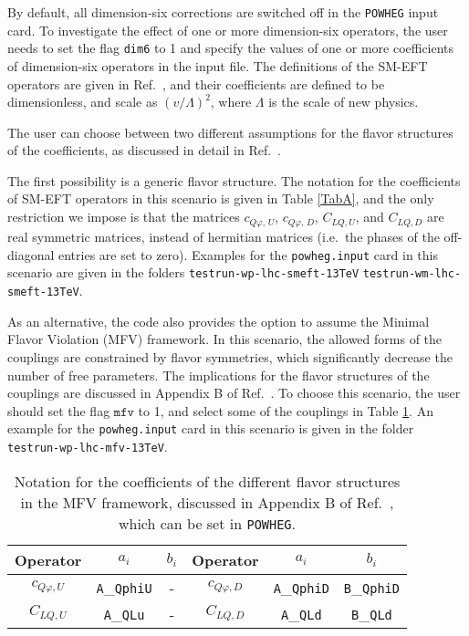 \documentclass[paper]{JHEP3}
\newcommand\POWHEG{{\tt POWHEG}}
\begin{document}
By default, all dimension-six corrections are switched off in the \POWHEG{} input card.
To investigate the effect of one or more dimension-six operators, the user  needs to set the flag \texttt{dim6} to 1 and specify the values of 
one or more coefficients of dimension-six operators in the input file. The definitions of the SM-EFT operators are given in Ref.\ \cite{Alioli:2018ljm},
and their coefficients are defined to be dimensionless, and scale as $(v/\Lambda)^2$, where $\Lambda$ is the scale of new physics.

The user can choose between two different assumptions for the flavor structures of the coefficients, as discussed in detail in Ref.\ \cite{Alioli:2018ljm}.

The first possibility is a generic flavor structure. The notation for the coefficients of SM-EFT operators in this scenario is given in Table \ref{TabA},
and the only restriction we impose is that the matrices $c^{}_{Q\varphi,\, U}$, $c^{}_{Q\varphi,\, D}$, 
$C_{LQ,U}$, and $C_{LQ,D}$  are real symmetric matrices, instead of hermitian matrices (i.e.\ the phases of the off-diagonal 
entries are set to zero). 
Examples for the \texttt{powheg.input}  card in this scenario are given in the folders \texttt{testrun-wp-lhc-smeft-13TeV}
\texttt{testrun-wm-lhc-smeft-13TeV}.


As an alternative, the code also provides the option to assume the Minimal Flavor Violation (MFV) framework. In this scenario, the allowed forms of the couplings are constrained by 
flavor symmetries, which significantly decrease the number of free parameters. 
The implications for the flavor structures of the couplings are discussed in Appendix B of Ref.\ \cite{Alioli:2018ljm}.
To choose this scenario, the user should set the flag $\texttt{mfv}$ to 1, and select some of the couplings in Table \ref{tab:mfv}.
An example for the \texttt{powheg.input}  card in this scenario is given in the folder \texttt{testrun-wp-lhc-mfv-13TeV}.

\begin{table}
\center
\begin{tabular}{||c|c  c|| c | c c || }
\hline
	Operator    & $a_i$ & $b_i$ & Operator & $a_i$ & $b_i$\\\hline
$	c_{Q\varphi,U}$ & \texttt{A}\_\texttt{QphiU} & - &
$	c_{Q\varphi,D}$ & \texttt{A}\_\texttt{QphiD} & \texttt{B}\_\texttt{QphiD}  \\
$	C_{LQ,U}$   & \texttt{A}\_\texttt{QLu} &-&
$	C_{LQ,D}$   & \texttt{A}\_\texttt{QLd}& \texttt{B}\_\texttt{QLd} \\
\hline
\end{tabular}
\caption{Notation for the coefficients of the different flavor structures in the MFV framework, discussed in Appendix B of Ref.\ \cite{Alioli:2018ljm}, which can be set in \texttt{POWHEG}.}\label{tab:mfv}
\end{table}
\end{document}

